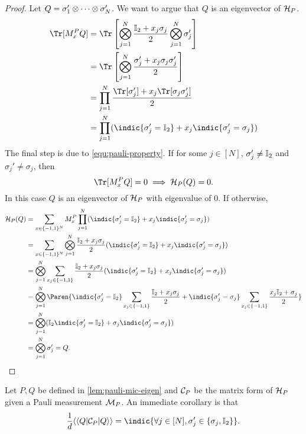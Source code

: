 \begin{proof}
Let $Q=\sigma_1'\otimes\cdots\otimes\sigma_{{N}}'$. We want to argue that $Q$ is an eigenvector of $\mathcal{H}_P$.  
\begin{align*}
\Tr[M_x^PQ]&=\Tr\left[\bigotimes_{j=1}^{\nqubits}\frac{\eye_2+x_j\sigma_j}{2}\bigotimes_{j=1}^{\nqubits}\sigma_j'\right]\\
    &=\Tr\left[\bigotimes_{j=1}^{\nqubits}\frac{\sigma_j'+x_j\sigma_j\sigma_j'}{2}\right]\\
    &=\prod_{j=1}^{\nqubits}\frac{\Tr[\sigma_j']+x_j\Tr[\sigma_j\sigma_j']}{2}\\
    &=\prod_{j=1}^{N}(\indic{\sigma_j'=\eye_2}+x_j\indic{\sigma_{j}'=\sigma_j})
\end{align*}
The final step is due to \eqref{equ:pauli-property}.
If for some $j\in[N]$, $\sigma_j'\ne \mathbb{I}_2$ and $\sigma_j'\ne\sigma_j$, then
\[
\Tr[M_x^PQ]=0\implies\Luders_P(Q)=0.
\]
In this case $Q$ is an eigenvector of $\mathcal{H}_P$ with eigenvalue of 0. If otherwise,
\begin{align*}
    \Luders_P(Q)&=\sum_{x\in\{-1,1\}^{\nqubits}}M_x^P\prod_{j=1}^{N}(\indic{\sigma_j'=\eye_2}+x_j\indic{\sigma_{j}'=\sigma_j})\\
    &=\sum_{x\in\{-1, 1\}^{\nqubits}}\bigotimes_{j=1}^{\nqubits}\frac{\eye_2+x_j\sigma_j}{2}(\indic{\sigma_j'=\eye_2}+x_j\indic{\sigma_{j}'=\sigma_j})\\
    &=\bigotimes_{j=1}^{\nqubits}\sum_{x_j\in\{-1,1\}}\frac{\eye_2+x_j\sigma_j}{2}(\indic{\sigma_j'=\eye_2}+x_j\indic{\sigma_{j}'=\sigma_j})\\
    &=\bigotimes_{j=1}^{\nqubits}\Paren{\indic{\sigma_j'=\eye_2}\sum_{x_j\in\{-1,1\}}\frac{\eye_2+x_j\sigma_j}{2}+\indic{\sigma_j'=\sigma_j}\sum_{x_j\in\{-1,1\}}\frac{x_j\eye_2+\sigma_j}{2}} \\
    &=\bigotimes_{j=1}^{\nqubits}(\eye_2\indic{\sigma_j'=\eye_2}+\sigma_j\indic{\sigma_{j}'=\sigma_j})\\
    &=\bigotimes_{j=1}^{\nqubits}\sigma_j'=Q.\qedhere
\end{align*}
\end{proof}

Let $P,Q$ be defined in \cref{lem:pauli-mic-eigen} and ${\mathcal{C}}_P$ be the matrix form of $\mathcal{H}_P$ given a Pauli measurement $\mathcal{M}_P$. An immediate corollary is that
\begin{equation}
    \frac{1}{\dims}\vadj{Q} {\Choi}_P \vvec{Q}=\indic{\forall j\in[\nqubits], \sigma_j'\in\{\sigma_j,\eye_2\}}.
    \label{equ:pauli-mic-sum}
\end{equation}

